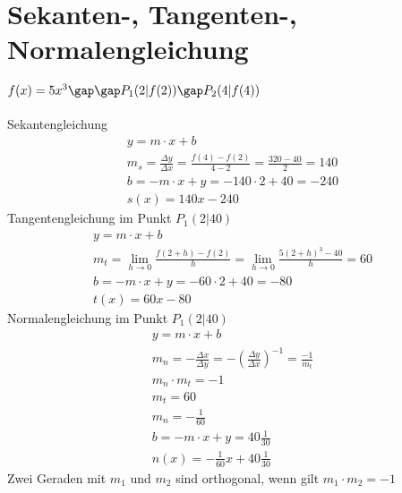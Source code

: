\section{Sekanten-, Tangenten-, Normalengleichung}
$f(x) = 5x^3\gap\gap P_1(2|f(2))\gap P_2(4|f(4))$ \\\\
Sekantengleichung
\begin{gather*}
  y = m \cdot x + b \\
  m_s = \frac{\Delta y}{\Delta x} = \frac{f(4) - f(2)}{4 - 2} = \frac{320 - 40}{2} = 140 \\
  b = -m \cdot x + y = -140 \cdot 2 + 40 = -240 \\
  s(x) = 140x - 240
\end{gather*}
Tangentengleichung im Punkt $P_1(2|40)$
\begin{gather*}
  y = m \cdot x + b \\
  m_t = \lim\limits_{h \to 0} \frac{f(2 + h) - f(2)}{h} = \lim\limits_{h \to 0} \frac{5(2 + h)^3 - 40}{h} = 60 \\
  b = -m \cdot x + y = -60 \cdot 2 + 40 = -80 \\
  t(x) = 60x - 80
\end{gather*}
Normalengleichung im Punkt $P_1(2|40)$
\begin{gather*}
  y = m \cdot x + b \\
  m_n = -\frac{\Delta x}{\Delta y} = -(\frac{\Delta y}{\Delta x})^{-1} = \frac{-1}{m_t} \\
  m_n \cdot m_t = -1 \\
  m_t = 60 \\
  m_n = -\frac{1}{60} \\
  b = -m \cdot x + y = 40\frac{1}{30} \\
  n(x) = -\frac{1}{60}x + 40\frac{1}{30}
\end{gather*}
Zwei Geraden mit $m_1$ und $m_2$ sind orthogonal, wenn gilt $m_1 \cdot m_2 = -1$

